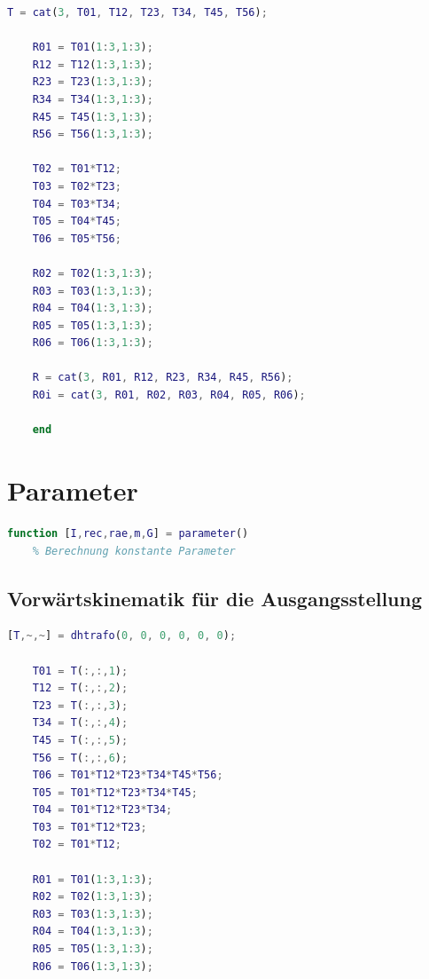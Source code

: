 \begin{lstlisting}[language=Matlab, numbers=none]
	T = cat(3, T01, T12, T23, T34, T45, T56);
	
	R01 = T01(1:3,1:3);
	R12 = T12(1:3,1:3);
	R23 = T23(1:3,1:3);
	R34 = T34(1:3,1:3);
	R45 = T45(1:3,1:3);
	R56 = T56(1:3,1:3);
	
	T02 = T01*T12;
	T03 = T02*T23;
	T04 = T03*T34;
	T05 = T04*T45;
	T06 = T05*T56;
	
	R02 = T02(1:3,1:3);
	R03 = T03(1:3,1:3);
	R04 = T04(1:3,1:3);
	R05 = T05(1:3,1:3);
	R06 = T06(1:3,1:3);
	
	R = cat(3, R01, R12, R23, R34, R45, R56);
	R0i = cat(3, R01, R02, R03, R04, R05, R06);
	
	end
\end{lstlisting}
\label{add:systemparameter}
%
%
%
\section{Parameter}
\begin{lstlisting}[language=Matlab, numbers=none]
	function [I,rec,rae,m,G] = parameter()
	% Berechnung konstante Parameter
\end{lstlisting}
%
\subsection{Vorwärtskinematik für die Ausgangsstellung}
%
\begin{lstlisting}[language=Matlab, numbers=none]
	[T,~,~] = dhtrafo(0, 0, 0, 0, 0, 0);
	
	T01 = T(:,:,1);
	T12 = T(:,:,2);
	T23 = T(:,:,3);
	T34 = T(:,:,4);
	T45 = T(:,:,5);
	T56 = T(:,:,6);
	T06 = T01*T12*T23*T34*T45*T56;
	T05 = T01*T12*T23*T34*T45;
	T04 = T01*T12*T23*T34;
	T03 = T01*T12*T23;
	T02 = T01*T12;
	
	R01 = T01(1:3,1:3);
	R02 = T02(1:3,1:3);
	R03 = T03(1:3,1:3);
	R04 = T04(1:3,1:3);
	R05 = T05(1:3,1:3);
	R06 = T06(1:3,1:3);
\end{lstlisting}
%
